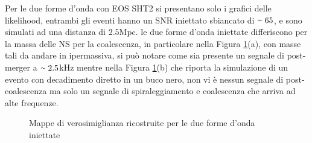 Per le due forme d'onda con EOS SHT2 si presentano solo i grafici delle likelihood, entrambi gli eventi hanno un SNR iniettato sbiancato di $\smallsim 65$, e sono simulati ad una distanza di $2.5$Mpc. le due forme d'onda iniettate differiscono per la massa delle NS per la coalescenza, in particolare nella Figura \ref{fig:likelihood_sht2}(a), con masse tali da andare in ipermassiva, si può notare come sia presente un segnale di post-merger a $\smallsim 2.5$kHz mentre nella Figura \ref{fig:likelihood_sht2}(b) che riporta la simulazione di un evento con decadimento diretto in un buco nero, non vi è nessun segnale di post-coalescenza ma solo un segnale di spiraleggiamento e coalescenza che arriva ad alte frequenze. 
\begin{figure}[H]
	\vspace{-20pt}
	\centering
	\vspace{-5pt}
	\caption{Mappe di verosimiglianza ricostruite per le due forme d'onda iniettate}
	\label{fig:likelihood_sht2}
	\vspace{-15pt}
\end{figure}

